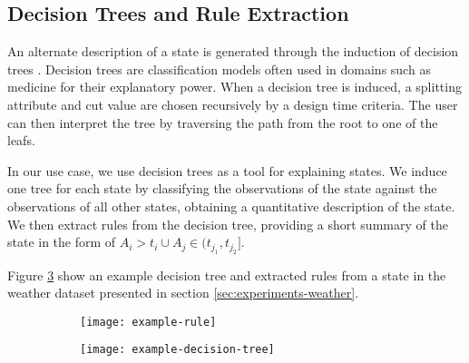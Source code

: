 \iffalse
In order to assist the user in identifying the meaning of states, the system provides automatic default
state names, based on the distribution of attributes in the state. Each state is given a default name
by combining its most outstanding attribute with a discrete level: LOWEST, LOW, HIGH or
HIGHEST.

The attribute and the level are chosen by comparing its distribution inside the state to the global
distribution in all the states through histograms. This is achieved by first computing the percentiles
of the global distribution. The $40^{th}$ percentile is then computed for the state distribution and
compared against the global distribution. If this percentile lies below the $25^{th}$ or $12^{th}$
percentile, the state is marked with LOW or LOWEST respectively. The final name is chosen according
to the attribute which lies in the lowest percentile.
\fi

\subsection{Decision Trees and Rule Extraction}

An alternate description of a state is generated through the induction of decision trees \cite{Witten:2005:DMP:1205860}. Decision
trees are classification models often used in domains such as medicine for their explanatory power.
When a decision tree is induced, a splitting attribute and cut value are chosen recursively by a
design time criteria. The user can then interpret the tree by traversing the path from the root 
to one of the leafs.

In our use case, we use decision trees as a tool for explaining states. We induce one tree for each
state by classifying the observations of the state against the observations of all other states,
obtaining a quantitative description of the state. We then extract rules from the decision tree,
providing a short summary of the state in the form of $A_i > t_i \cup A_j \in (t_{j_1}, t_{j_2}]$.

Figure \ref{fig:example-decision-tree-and-rule} show an example decision tree and extracted rules
from a state in the weather dataset presented in section \ref{sec:experiments-weather}.

\begin{figure}[h!]
	\centering
	\begin{subfigure}{.3\columnwidth}
	  	\centering
	  	\texttt{[image: example-rule]}
  		\caption{}
  		\label{fig:example-rule}
	\end{subfigure}
	\begin{subfigure}{.68\columnwidth}
	  	\centering
	  	\texttt{[image: example-decision-tree]}
	  	\caption{}
	  	\label{fig:example-decision-tree}
	\end{subfigure}
	\caption{\lstopar{[TODO]}}
	\label{fig:example-decision-tree-and-rule}
\end{figure}

